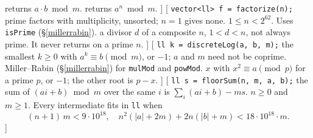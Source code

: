 	 returns $a \cdot b \bmod m$.
	 returns $a^n \bmod m$.
]\label{millerrabin}
[
	 \texttt{vector<ll> f = factorize(n);}
	 prime factors with multiplicity, unsorted; $n = 1$ gives none.
	 $1 \le n < 2^{62}$. Uses \texttt{isPrime} (\S\ref{millerrabin}).
	 a divisor $d$ of a composite $n$, $1 < d < n$, not always prime. It never returns on a prime $n$.
]\label{pollardrho}
[
	 \texttt{ll k = discreteLog(a, b, m);}
	 the smallest $k \ge 0$ with $a^k \equiv b \pmod m$, or $-1$; $a$ and $m$ need not be coprime.
	 Miller--Rabin (\S\ref{millerrabin}) for \texttt{mulMod} and \texttt{powMod}.
	 $x$ with $x^2 \equiv a \pmod p$ for a prime $p$, or $-1$; the other root is $p - x$.
]\label{dlog}
[
	 \texttt{ll s = floorSum(n, m, a, b);}
	 the sum of $(a i + b) \bmod m$ over the same $i$ is $\sum_i (a i + b) - m s$.
	 $n \ge 0$ and $m \ge 1$. Every intermediate fits in \texttt{ll} when
	\[ (n + 1)\,m < 9 \cdot 10^{18}, \quad n^2 (|a| + 2m) + 2n (|b| + m) < 18 \cdot 10^{18} \cdot m. \]
]\label{floorsum}

